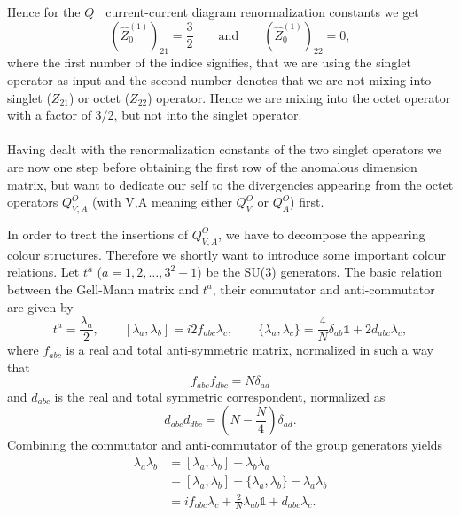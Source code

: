 	Hence for the $Q_-$ current-current diagram renormalization constants we get
	\begin{equation}
		 (\hat Z^{(1)}_0)_{21} = \frac{3}{2} \qquad \text{and} \qquad (\hat Z^{(1)}_0)_{22} = 0,	
	\end{equation} 
	where the first number of the indice signifies, that we are using the singlet operator as input and the second number denotes that we are not mixing into singlet ($Z_{21}$) or octet ($Z_{22}$) operator. Hence we are mixing into the octet operator with a factor of 3/2, but not into the singlet operator.  \\\\
	Having dealt with the renormalization constants of the two singlet operators we are now one step before obtaining the first row of the anomalous dimension matrix, but want to dedicate our self to the divergencies appearing from the octet operators $Q^O_{V,A}$  (with V,A meaning either $Q^O_V$ or $Q^O_A$) first. \par
	In order to treat the insertions of $Q^O_{V,A}$, we have to decompose the appearing colour structures. Therefore we shortly want to introduce some important colour relations. Let $t^a$ ($a=1,2,\ldots,3^2-1$) be the SU(3) generators. The basic relation between the Gell-Mann matrix and $t^a$, their commutator and anti-commutator are given by
	\begin{equation}
                t^a = \frac{\lambda_a}{2}, \qquad  [\lambda_a, \lambda_b] = i2f_{abc} \lambda_c, \qquad \{ \lambda_a, \lambda_c \} = \frac{4}{N} \delta_{ab} \mathbb{1} + 2 d_{abc} \lambda_c,
        \end{equation}
	where $f_{abc}$ is a real and total anti-symmetric matrix, normalized in such a way that 
	\begin{equation}
		f_{abc}f_{dbc} = N \delta_{ad}
	\end{equation}	
	and $d_{abc}$ is the real and total symmetric correspondent, normalized as
	\begin{equation}
		d_{abc}d_{dbc} = \left( N - \frac{N}{4} \right) \delta_{ad}.
	\end{equation}
	Combining the commutator and anti-commutator of the group generators yields
        \begin{equation}
                \begin{split}
                        \lambda_a \lambda_b &= [\lambda_a, \lambda_b] + \lambda_b\lambda_a \\
                        &= [\lambda_a, \lambda_b] + \{\lambda_a, \lambda_b\} - \lambda_a \lambda_b \\
                        &= if_{abc} \lambda_c + \frac{2}{N} \lambda_{ab} \mathbb{1} + d_{abc}\lambda_c.
                \end{split}
        \end{equation}
